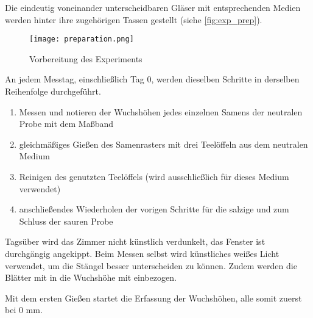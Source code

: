         Die eindeutig voneinander unterscheidbaren Gläser mit entsprechenden Medien werden hinter ihre zugehörigen Tassen gestellt (siehe \autoref{fig:exp_prep}).
        \begin{figure}[h]
            \centering
            \texttt{[image: preparation.png]}
            \caption{Vorbereitung des Experiments}
            \label{fig:exp_prep}
        \end{figure}

        \newpage
        An jedem Messtag, einschließlich Tag 0, werden dieselben Schritte in derselben Reihenfolge durchgeführt.
        \begin{enumerate}[1.]
            \item Messen und notieren der Wuchshöhen jedes einzelnen Samens der neutralen Probe mit dem Maßband
            \item gleichmäßiges Gießen des Samenrasters mit drei Teelöffeln aus dem neutralen Medium
            \item Reinigen des genutzten Teelöffels (wird ausschließlich für dieses Medium verwendet)
            \item anschließendes Wiederholen der vorigen Schritte für die salzige und zum Schluss der sauren Probe
        \end{enumerate}
        Tagsüber wird das Zimmer nicht künstlich verdunkelt, das Fenster ist durchgängig angekippt. Beim Messen selbst wird künstliches weißes Licht verwendet, um die Stängel besser unterscheiden zu können. Zudem werden die Blätter mit in die Wuchshöhe mit einbezogen.

        Mit dem ersten Gießen startet die Erfassung der Wuchshöhen, alle somit zuerst\\bei 0 mm.
    

